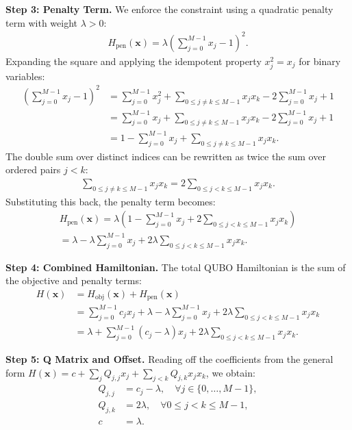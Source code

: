 \documentclass[12pt]{article}
\begin{document}
\textbf{Step 3: Penalty Term.}
We enforce the constraint using a quadratic penalty term with weight $\lambda > 0$:
\begin{align}
    H_{\text{pen}}(\mathbf{x}) = \lambda \left( \sum_{j=0}^{M-1} x_j - 1 \right)^2.
\end{align}
Expanding the square and applying the idempotent property $x_j^2 = x_j$ for binary variables:
\begin{align}
    \left( \sum_{j=0}^{M-1} x_j - 1 \right)^2 &= \sum_{j=0}^{M-1} x_j^2 + \sum_{0 \le j \neq k \le M-1} x_j x_k - 2 \sum_{j=0}^{M-1} x_j + 1 \nonumber \\
    &= \sum_{j=0}^{M-1} x_j + \sum_{0 \le j \neq k \le M-1} x_j x_k - 2 \sum_{j=0}^{M-1} x_j + 1 \nonumber \\
    &= 1 - \sum_{j=0}^{M-1} x_j + \sum_{0 \le j \neq k \le M-1} x_j x_k.
\end{align}
The double sum over distinct indices can be rewritten as twice the sum over ordered pairs $j < k$:
\begin{align}
    \sum_{0 \le j \neq k \le M-1} x_j x_k = 2 \sum_{0 \le j < k \le M-1} x_j x_k.
\end{align}
Substituting this back, the penalty term becomes:
\begin{align}
    H_{\text{pen}}(\mathbf{x}) = \lambda \left( 1 - \sum_{j=0}^{M-1} x_j + 2 \sum_{0 \le j < k \le M-1} x_j x_k \right) \nonumber \\
    = \lambda - \lambda \sum_{j=0}^{M-1} x_j + 2\lambda \sum_{0 \le j < k \le M-1} x_j x_k.
\end{align}

\textbf{Step 4: Combined Hamiltonian.}
The total QUBO Hamiltonian is the sum of the objective and penalty terms:
\begin{align}
    H(\mathbf{x}) &= H_{\text{obj}}(\mathbf{x}) + H_{\text{pen}}(\mathbf{x}) \nonumber \\
    &= \sum_{j=0}^{M-1} c_j x_j + \lambda - \lambda \sum_{j=0}^{M-1} x_j + 2\lambda \sum_{0 \le j < k \le M-1} x_j x_k \nonumber \\
    &= \lambda + \sum_{j=0}^{M-1} (c_j - \lambda) x_j + 2\lambda \sum_{0 \le j < k \le M-1} x_j x_k.
\end{align}

\textbf{Step 5: Q Matrix and Offset.}
Reading off the coefficients from the general form $H(\mathbf{x}) = c + \sum_{j} Q_{j,j} x_j + \sum_{j < k} Q_{j,k} x_j x_k$, we obtain:
\begin{align}
    Q_{j,j} &= c_j - \lambda, \quad \forall j \in \{0, \dots, M-1\}, \nonumber \\
    Q_{j,k} &= 2\lambda, \quad \forall 0 \le j < k \le M-1, \nonumber \\
    c &= \lambda.
\end{align}
\end{document}
